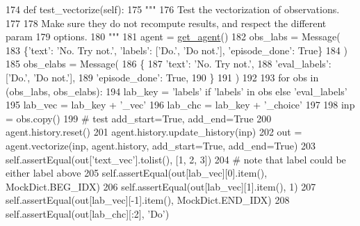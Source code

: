 \begin{DoxyCode}
174     \textcolor{keyword}{def }test\_vectorize(self):
175         \textcolor{stringliteral}{"""}
176 \textcolor{stringliteral}{        Test the vectorization of observations.}
177 \textcolor{stringliteral}{}
178 \textcolor{stringliteral}{        Make sure they do not recompute results, and respect the different param}
179 \textcolor{stringliteral}{        options.}
180 \textcolor{stringliteral}{        """}
181         agent = \hyperlink{namespacetests_1_1test__torch__agent_ae929d109305aaea29fbfa13ecf1f32e9}{get\_agent}()
182         obs\_labs = Message(
183             \{\textcolor{stringliteral}{'text'}: \textcolor{stringliteral}{'No. Try not.'}, \textcolor{stringliteral}{'labels'}: [\textcolor{stringliteral}{'Do.'}, \textcolor{stringliteral}{'Do not.'}], \textcolor{stringliteral}{'episode\_done'}: \textcolor{keyword}{True}\}
184         )
185         obs\_elabs = Message(
186             \{
187                 \textcolor{stringliteral}{'text'}: \textcolor{stringliteral}{'No. Try not.'},
188                 \textcolor{stringliteral}{'eval\_labels'}: [\textcolor{stringliteral}{'Do.'}, \textcolor{stringliteral}{'Do not.'}],
189                 \textcolor{stringliteral}{'episode\_done'}: \textcolor{keyword}{True},
190             \}
191         )
192 
193         \textcolor{keywordflow}{for} obs \textcolor{keywordflow}{in} (obs\_labs, obs\_elabs):
194             lab\_key = \textcolor{stringliteral}{'labels'} \textcolor{keywordflow}{if} \textcolor{stringliteral}{'labels'} \textcolor{keywordflow}{in} obs \textcolor{keywordflow}{else} \textcolor{stringliteral}{'eval\_labels'}
195             lab\_vec = lab\_key + \textcolor{stringliteral}{'\_vec'}
196             lab\_chc = lab\_key + \textcolor{stringliteral}{'\_choice'}
197 
198             inp = obs.copy()
199             \textcolor{comment}{# test add\_start=True, add\_end=True}
200             agent.history.reset()
201             agent.history.update\_history(inp)
202             out = agent.vectorize(inp, agent.history, add\_start=\textcolor{keyword}{True}, add\_end=\textcolor{keyword}{True})
203             self.assertEqual(out[\textcolor{stringliteral}{'text\_vec'}].tolist(), [1, 2, 3])
204             \textcolor{comment}{# note that label could be either label above}
205             self.assertEqual(out[lab\_vec][0].item(), MockDict.BEG\_IDX)
206             self.assertEqual(out[lab\_vec][1].item(), 1)
207             self.assertEqual(out[lab\_vec][-1].item(), MockDict.END\_IDX)
208             self.assertEqual(out[lab\_chc][:2], \textcolor{stringliteral}{'Do'})

\end{DoxyCode}
